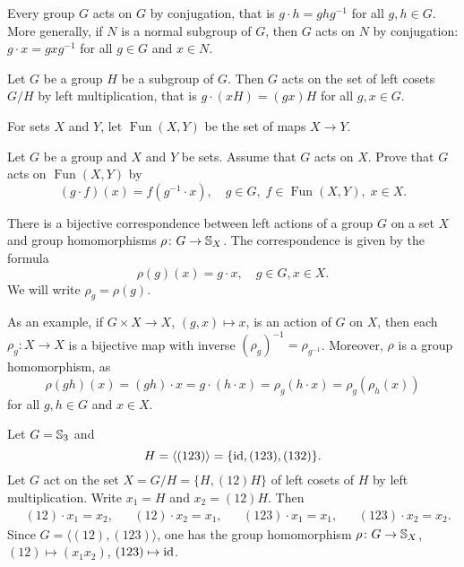 \begin{example}
Every group $G$ acts on $G$ by conjugation, that is
$g\cdot h=ghg^{-1}$ for all $g,h\in G$. More generally, 
if $N$ is a normal subgroup of $G$, then $G$ acts on
$N$ by conjugation: $g\cdot x=gx
g^{-1}$ for all $g\in G$ and $x\in N$. 
\end{example}

\begin{example}
Let $G$ be a group $H$ be a subgroup of $G$. Then $G$ 
acts on the set of left cosets $G/H$ by left multiplication, that 
is $g\cdot (xH)=(gx)H$ for all $g,x\in G$.
\end{example}

For sets $X$ and $Y$, let 
$\operatorname{Fun}(X,Y)$ be the set of maps $X\to Y$. 

\begin{exercise}
\label{xca:dual}
    Let $G$ be a group and $X$ and $Y$ be sets. Assume that $G$ acts on $X$. 
    Prove that 
    $G$ acts on $\operatorname{Fun}(X,Y)$ by 
    \[ 
        (g\cdot f)(x)=f(g^{-1}\cdot x),\quad g\in G,\; f\in\operatorname{Fun}(X,Y),\; x\in X.
    \]  
\end{exercise}

There is a bijective correspondence between 
left actions of a group $G$ on a set $X$ and
group homomorphisms 
$\rho\colon G\to\mathbb{S}_X$. The correspondence is given by
the formula 
\[
\rho(g)(x)=g\cdot x,\quad g\in G,x\in X.
\]
We will write $\rho_g=\rho(g)$.

As an example, if $G\times X\to X$, $(g,x)\mapsto x$, is 
an action of $G$ on $X$, then
each $\rho_g\colon X\to X$ is a bijective map with inverse 
$(\rho_g)^{-1}=\rho_{g^{-1}}$. Moreover, 
 $\rho$ is a group homomorphism, as 
\[
\rho(gh)(x)=(gh)\cdot x=g\cdot (h\cdot x)=\rho_g(h\cdot x)=\rho_g(\rho_h(x))
\]
for all $g,h\in G$ and $x\in X$.

\begin{example}
Let $G=\mathbb{S}_3$ and 
\[
H=\langle (123)\rangle=\{\operatorname{id},(123),(132)\}.
\]
Let $G$ act on the set $X=G/H=\{H,(12)H\}$ of left cosets of $H$ 
by left multiplication. Write 
$x_1=H$ and $x_2=(12)H$. Then
\begin{align*}
&(12)\cdot x_1=x_2,
&&(12)\cdot x_2=x_1,
&&(123)\cdot x_1=x_1,
&&(123)\cdot x_2=x_2.
\end{align*}
Since $G=\langle (12),(123)\rangle$, one has the group 
homomorphism 
$\rho\colon G\to\mathbb{S}_{X}$, 
$(12)\mapsto (x_1x_2)$, $(123)\mapsto\operatorname{id}$.
\end{example}

